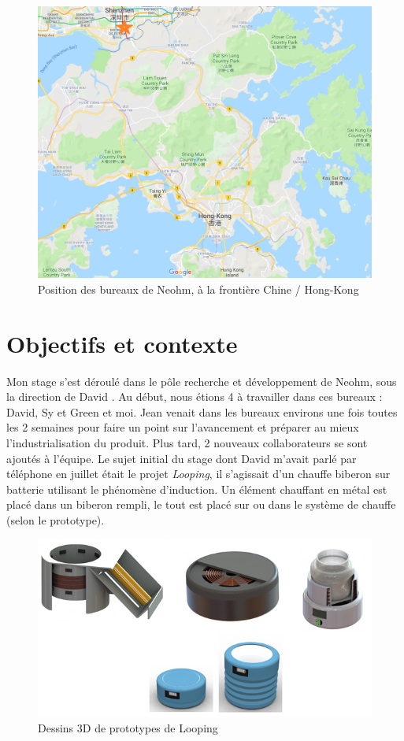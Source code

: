 \documentclass[a4paper, 12pt, sffamily]{report}
\begin{document}
\begin{figure}
\centering
\includegraphics[scale=0.4]{figures/screenshots/screen_maps.png}
\caption{Position des bureaux de Neohm, à la frontière Chine / Hong-Kong}
\label{fig:screen_maps}
\end{figure}

\chapter{Objectifs et contexte}
Mon stage s’est déroulé dans le pôle recherche et développement de Neohm, sous la direction de David . Au début, nous étions 4 à travailler dans ces bureaux : David, Sy et Green et moi. Jean venait dans les bureaux environs une fois toutes les 2 semaines pour faire un point sur l'avancement et préparer au mieux l'industrialisation du produit. Plus tard, 2 nouveaux collaborateurs se sont ajoutés à l’équipe.
Le sujet initial du stage dont David m’avait parlé par téléphone en juillet était le projet \emph{Looping}, il s’agissait d’un chauffe biberon sur batterie utilisant le phénomène d’induction. Un élément chauffant en métal est placé dans un biberon rempli, le tout est placé sur ou dans le système de chauffe (selon le prototype).

\begin{figure}[H]
\centering
\includegraphics[scale=0.75]{figures/screenshots/3D_drawing_looping.png}
\caption{Dessins 3D de prototypes de Looping}
\label{fig:3D_looping}
\end{figure}
\end{document}
